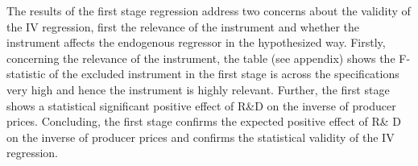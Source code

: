 \par   The results of the first stage regression address two concerns about the validity of the IV regression, first the relevance of the instrument and whether the instrument affects the endogenous regressor in the hypothesized way.
Firstly, concerning the relevance of the instrument, the table (see appendix) shows the F-statistic of the excluded instrument in the first stage is across the specifications very high and hence the instrument is highly relevant.
Further, the first stage shows a statistical significant positive effect of  R\&D on the inverse of producer prices.
 Concluding, the first stage confirms the expected positive effect of R\& D on the inverse of producer prices and confirms the statistical validity of the IV regression.   %
